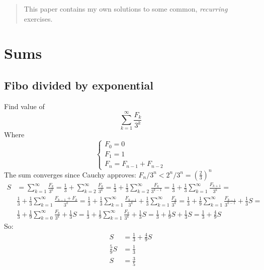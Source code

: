 \documentclass[12pt]{article}
\begin{document}
\maketitle

\begin{abstract}
This paper contains my own solutions to some common, \textit{recurring} exercises.
\end{abstract}

\tableofcontents

\section{Sums}
\subsection{Fibo divided by exponential}
Find value of
\[\sum_{k=1}^{\infty} \frac{F_k}{3^k}\]
Where
\[
\begin{cases}
F_0 = 0\\F_1 = 1\\F_n = F_{n-1} + F_{n-2}
\end{cases}\]
The sum converges since Cauchy approves: $F_n/3^n < 2^n/3^n = (\frac{2}{3})^n$
\[
\begin{split}
S &= \sum_{k=1}^{\infty} \frac{F_k}{3^k} =
\frac{1}{3} + \sum_{k=2}^{\infty} \frac{F_k}{3^k} =
\frac{1}{3} + \frac{1}{3} \sum_{k=2}^{\infty} \frac{F_k}{3^{k-1}} =
\frac{1}{3} + \frac{1}{3} \sum_{k=1}^{\infty} \frac{F_{k+1}}{3^k} =\\&
\frac{1}{3} + \frac{1}{3} \sum_{k=1}^{\infty} \frac{F_{k-1} + F_k}{3^k} =
\frac{1}{3} + \frac{1}{3} \sum_{k=1}^{\infty} \frac{F_{k-1}}{3^k} + \frac{1}{3} \sum_{k=1}^{\infty} \frac{F_k}{3^k} =
\frac{1}{3} + \frac{1}{9} \sum_{k=1}^{\infty} \frac{F_{k-1}}{3^{k-1}} + \frac{1}{3} S =\\&
\frac{1}{3} + \frac{1}{9} \sum_{k=0}^{\infty} \frac{F_{k}}{3^k} + \frac{1}{3} S =
\frac{1}{3} + \frac{1}{9} \sum_{k=1}^{\infty} \frac{F_{k}}{3^k} + \frac{1}{3} S =
\frac{1}{3} + \frac{1}{9} S + \frac{1}{3} S = \frac{1}{3} + \frac{4}{9} S
\end{split}
\]
So:
\begin{align*}
S &= \frac{1}{3} + \frac{4}{9} S\\
\frac{5}{9} S &= \frac{1}{3}\\
S &= \frac{3}{5}
\end{align*}
\end{document}
